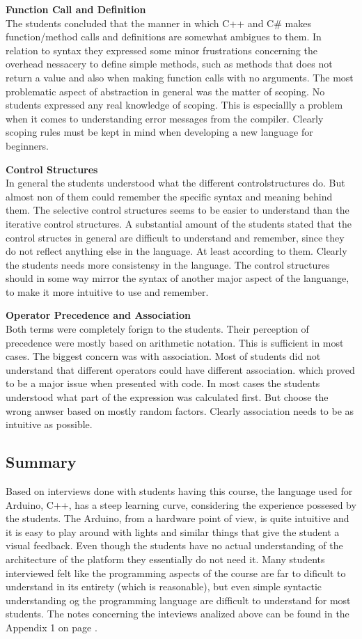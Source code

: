 \textbf{Function Call and Definition}\\
The students concluded that the manner in which C++ and C{\#} makes function/method calls and definitions are somewhat ambigues to them. In relation to syntax they expressed some minor frustrations concerning the overhead nessacery to define simple methods, such as methods that does not return a value and also when making function calls with no arguments. The most problematic aspect of abstraction in general was the matter of scoping. No students expressed any real knowledge of scoping. This is especiallly a problem when it comes to understanding error messages from the compiler. Clearly scoping rules must be kept in mind when developing a new language for beginners.

\textbf{Control Structures}\\
In general the students understood what the different controlstructures do. But almost non of them could remember the specific syntax and meaning behind them. The selective control structures seems to be easier to understand than the iterative control structures. A substantial amount of the students stated that the control structes in general are difficult to understand and remember, since they do not reflect anything else in the language. At least according to them.
Clearly the students needs more consistensy in the language. The control structures should in some way mirror the syntax of another major aspect of the languange, to make it more intuitive to use and remember.

\textbf{Operator Precedence and Association}\\
Both terms were completely forign to the students. Their perception of precedence were mostly based on arithmetic notation. This is sufficient in most cases. The biggest concern was with association. Most of students did not understand that different operators could have different association. which proved to be a major issue when presented with code. In most cases the students understood what part of the expression was calculated first. But choose the wrong anwser based on mostly random factors. Clearly association needs to be as intuitive as possible.

\subsection{Summary}
Based on interviews done with students having this course, the language used for Arduino, C++, has a steep learning curve, considering the experience possesed by the students. The Arduino, from a hardware point of view, is quite intuitive and it is easy to play around with lights and similar things that give the student a visual feedback. Even though the students have no actual understanding of the architecture of the platform they essentially do not need it. Many students interviewed felt like the programming aspects of the course are far to dificult to understand in its entirety (which is reasonable), but even simple syntactic understanding og the programming language are difficult to understand for most students. The notes concerning the inteviews analized above can be found in the Appendix 1 on page \pageref{Interviews}.


